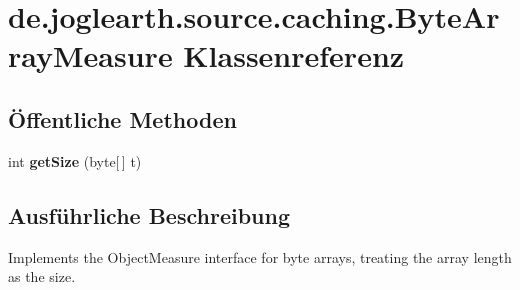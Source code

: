 \section{de.\-joglearth.\-source.\-caching.\-Byte\-Array\-Measure Klassenreferenz}
\label{classde_1_1joglearth_1_1source_1_1caching_1_1_byte_array_measure}
\subsection*{Öffentliche Methoden}
\begin{DoxyCompactItemize}
\item 
int {\bfseries get\-Size} (byte[$\,$] t)\label{classde_1_1joglearth_1_1source_1_1caching_1_1_byte_array_measure_a637b140ddd22755079baf47401d8fa7f}

\end{DoxyCompactItemize}


\subsection{Ausführliche Beschreibung}
Implements the Object\-Measure interface for byte arrays, treating the array length as the size. 